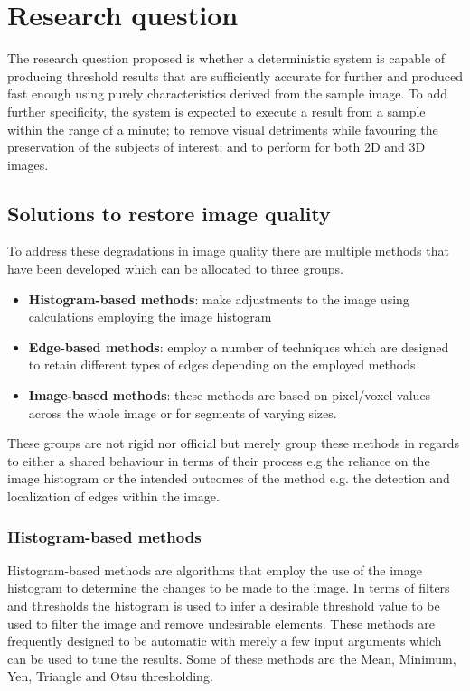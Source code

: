 \section{Research question}\label{sec:res_que}
The research question proposed is whether a deterministic system is capable of producing threshold results that are sufficiently accurate for further and produced fast enough using purely characteristics derived from the sample image. To add further specificity, the system is expected to execute a result from a sample within the range of a minute; to remove visual detriments while favouring the preservation of the subjects of interest; and to perform for both 2D and 3D images.



\subsection{Solutions to restore image quality}
To address these degradations in image quality there are multiple methods that have been developed which can be allocated to three groups. 
\begin{itemize}
    \item \textbf{Histogram-based methods}: make adjustments to the image using calculations employing the image histogram
    \item \textbf{Edge-based methods}: employ a number of techniques which are designed to retain different types of edges depending on the employed methods
    \item \textbf{Image-based methods}: these methods are based on pixel/voxel values across the whole image or for segments of varying sizes.
\end{itemize}
These groups are not rigid nor official but merely group these methods in regards to either a shared behaviour in terms of their process e.g the reliance on the image histogram or the intended outcomes of the method e.g. the detection and localization of edges within the image.
\subsubsection{Histogram-based methods}
Histogram-based methods are algorithms that employ the use of the image histogram to determine the changes to be made to the image. In terms of filters and thresholds the histogram is used to infer a desirable threshold value to be used to filter the image and remove undesirable elements. These methods are frequently designed to be automatic with merely a few input arguments which can be used to tune the results. Some of these methods are the Mean, Minimum, Yen, Triangle and Otsu thresholding. 
